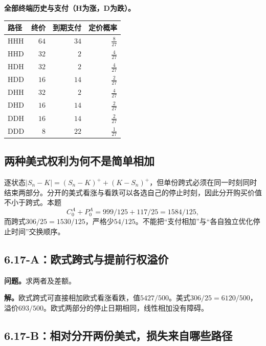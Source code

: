 \documentclass[11pt,a4paper,UTF8,fontset=fandol]{ctexart}
\begin{document}
\textbf{全部终端历史与支付（H为涨，D为跌）。}

\begin{longtable}[]{@{}lrrr@{}}
\toprule\noalign{}
路径 & 终价 & 到期支付 & 定价概率 \\
\midrule\noalign{}
\endhead
\bottomrule\noalign{}
\endlastfoot
HHH & \(64\) & \(34\) & \(\frac{8}{27}\) \\
HHD & \(32\) & \(2\) & \(\frac{4}{27}\) \\
HDH & \(32\) & \(2\) & \(\frac{4}{27}\) \\
HDD & \(16\) & \(14\) & \(\frac{2}{27}\) \\
DHH & \(32\) & \(2\) & \(\frac{4}{27}\) \\
DHD & \(16\) & \(14\) & \(\frac{2}{27}\) \\
DDH & \(16\) & \(14\) & \(\frac{2}{27}\) \\
DDD & \(8\) & \(22\) & \(\frac{1}{27}\) \\
\end{longtable}

\endgroup

\subsection{两种美式权利为何不是简单相加}\label{ux4e24ux79cdux7f8eux5f0fux6743ux5229ux4e3aux4f55ux4e0dux662fux7b80ux5355ux76f8ux52a0}

逐状态\(|S_n-K|=(S_n-K)^++(K-S_n)^+\)，但单份跨式必须在同一时刻同时结束两部分。分开的美式看涨与看跌可以各选自己的停止时刻，因此分开购买价值不小于跨式。本题
\[C_0^A+P_0^A=999/125+117/25=1584/125,\]
而跨式\(306/25=1530/125\)，严格少\(\boxed{54/125}\)。不能把``支付相加''与``各自独立优化停止时间''交换顺序。

\subsection{6.17-A：欧式跨式与提前行权溢价}\label{aux6b27ux5f0fux8de8ux5f0fux4e0eux63d0ux524dux884cux6743ux6ea2ux4ef7}

\textbf{问题。}求两者及差额。

\textbf{解。}欧式跨式可直接相加欧式看涨看跌，值\(5427/500\)。美式\(306/25=6120/500\)，溢价\(\boxed{693/500}\)。欧式两部分的停止日期相同，线性相加没有障碍。

\subsection{6.17-B：相对分开两份美式，损失来自哪些路径}\label{bux76f8ux5bf9ux5206ux5f00ux4e24ux4efdux7f8eux5f0fux635fux5931ux6765ux81eaux54eaux4e9bux8defux5f84}
\end{document}
